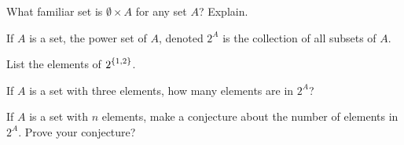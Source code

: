 \item What familiar set is $\emptyset \times A$ for any set $A$? Explain.  

\begin{comment}

\ExerciseSolution If $(x,a) \in \emptyset \times A$, then $x \in \emptyset$. But this is impossible, so there are no elements in $\emptyset \times A$. We conclude that $\emptyset \times A = \emptyset$.

\end{comment}


\item \label{ex:power_set} If $A$ is a set, the power set of $A$, denoted $2^A$ is the collection of all subsets of $A$. 
	\ba
	\item List the elements of $\displaystyle 2^{\{1,2\}}$. 
		
	\item If $A$ is a set with three elements, how many elements are in $2^A$?
		
	\item If $A$ is a set with $n$ elements, make a conjecture about the number of elements in $2^A$. Prove your conjecture?

	\ea
	
